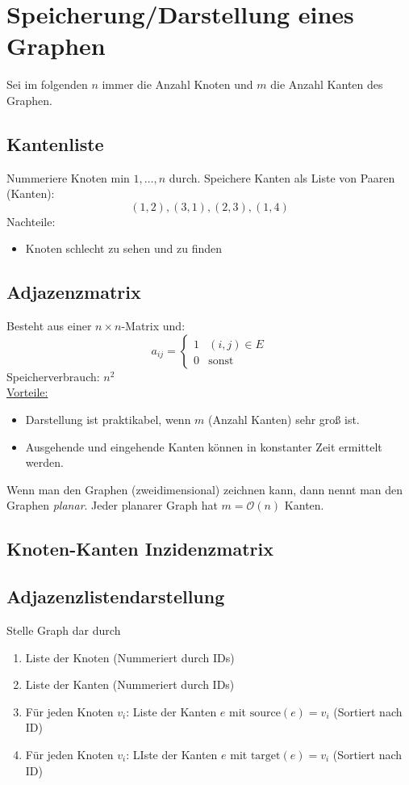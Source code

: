 \documentclass[11pt]{scrbook}
\begin{document}
\section{Speicherung/Darstellung eines Graphen}
Sei im folgenden $n$ immer die Anzahl Knoten und $m$ die Anzahl Kanten des Graphen.

\subsection{Kantenliste}
Nummeriere Knoten min $1,\dotsc,n$ durch.
Speichere Kanten als Liste von Paaren (Kanten):
\[
(1,2), (3,1), (2,3), (1,4)
\]
Nachteile:
\begin{itemize}
\item Knoten schlecht zu sehen und zu finden
\end{itemize}
\subsection{Adjazenzmatrix}
Besteht aus einer $n\times n$-Matrix und:
\[
a_{ij} = \begin{cases}
1&(i,j)\in E\\
0& \text{sonst}
\end{cases}
\]
Speicherverbrauch: $n^2$\\
\underline{Vorteile:}
\begin{itemize}
\item Darstellung ist praktikabel, wenn $m$ (Anzahl Kanten) sehr groß ist.
\item Ausgehende und eingehende Kanten können in konstanter Zeit ermittelt werden.
\end{itemize}

\begin{note}
Wenn man den Graphen (zweidimensional) zeichnen kann, dann nennt man den Graphen \emph{planar}.
Jeder planarer Graph hat $m=\mathcal O(n)$ Kanten.
\end{note}

\subsection{Knoten-Kanten Inzidenzmatrix}

\subsection{Adjazenzlistendarstellung}
Stelle Graph dar durch
\begin{enumerate}
\item Liste der Knoten (Nummeriert durch IDs)
\item Liste der Kanten (Nummeriert durch IDs)
\item Für jeden Knoten $v_i$: Liste der Kanten $e$ mit $\text{source}(e)=v_i$ (Sortiert nach ID)
\item Für jeden Knoten $v_i$: LIste der Kanten $e$ mit $\text{target}(e)=v_i$ (Sortiert nach ID)
\end{enumerate}
\end{document}
